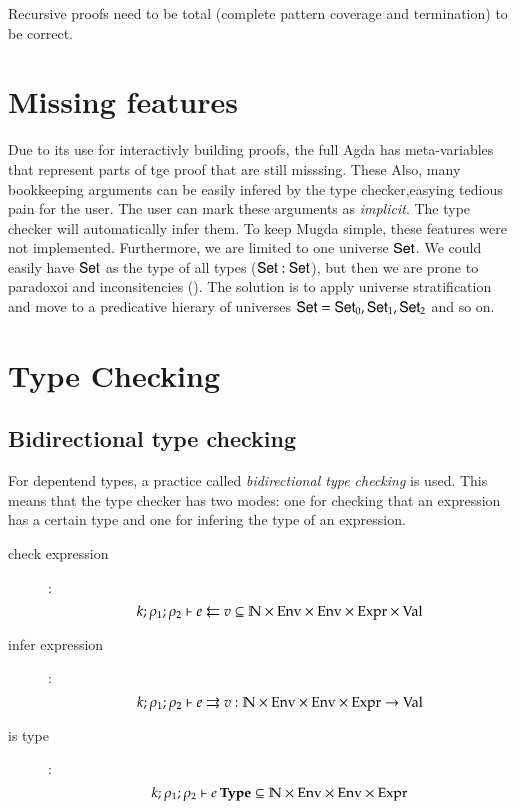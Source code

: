 Recursive proofs need to be total (complete pattern coverage and termination) to be correct.

\section{Missing features}
Due to its use for interactivly building proofs, the full Agda has meta-variables that represent parts of tge proof that are still misssing. These 
Also, many bookkeeping arguments can be easily infered by the type checker,easying tedious pain for the user.
The user can mark these arguments as \emph{implicit}. The type checker will automatically infer them.
To keep Mugda simple, these features were not implemented.
Furthermore, we are limited to one universe $\mathsf{Set}$.
We could easily have $\mathsf{Set}$ as the type of all types ($\mathsf{Set} : \mathsf{Set}$), but then we are prone to paradoxoi and inconsitencies (\cite{coquand86analysis,coquand92pattern}).
The solution is to apply universe stratification and move to a predicative hierary of universes $ \mathsf{Set} = \mathsf{Set}_0 , \mathsf{Set}_1 , \mathsf{Set}_2 $ and so on. 
\section{Type Checking}

\renewcommand\Check[5]{#1;#2;#3\vdash#4\leftleftarrows#5}
\newcommand\IsType[4]{#1;#2;#3\vdash#4\:\mathbf{Type}}
\newcommand\DataType[5]{#1;#2;#3;#4\vdash#5\:\mathbf{DataType}}
\newcommand\ConType[5]{#1;#2;#3;#4\vdash#5\:\mathbf{ConType}}
\newcommand\Infer[5]{#1;#2;#3\vdash#4\rightrightarrows#5}
\newcommand\EqVal[4]{#1;#2\vdash#3\Leftrightarrow#4}
\newcommand\FeqVal[4]{#1;#2\vdash#3{\:\leftrightarrow\:}#4}
\newcommand\DeqVal[2]{\vdash#1\leftrightarrow#2}
\newcommand\LeqVal[4]{#1;#2;\vdash#3\leq#4}
\newcommand\FleqVal[4]{#1;#2\vdash#3{\:\ll\:}#4}
\newcommand\DLeqVal[2]{\vdash#1\leq#2}
\newcommand\SzLeq[2]{\vdash#1\sqsubseteq#2}

\subsection{Bidirectional type checking} 
For depentend types, a practice called \emph{bidirectional type checking} is used.
This means that the type checker has two modes:
one for checking that an expression has a certain type and one for infering the type of an expression.

\begin{description}
\item[check expression]:
\[\Check{k}{\rho_1}{\rho_2}{e}{v} \subseteq \cN \times \Env \times \Env \times \Expr \times \Val\]
\item[infer expression]:
\[\Infer{k}{\rho_1}{\rho_2}{e}{v} : \cN \times \Env \times \Env \times \Expr \ra \Val\]
\item[is type]:
\[\IsType{k}{\rho_1}{\rho_2}{e} \subseteq \cN \times \Env \times \Env \times \Expr \]
\end{description}

